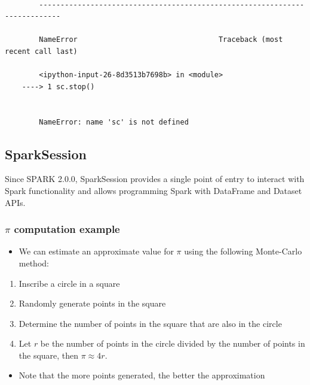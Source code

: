 \documentclass[11pt]{article}
\providecommand{\tightlist}{%
      \setlength{\itemsep}{0pt}\setlength{\parskip}{0pt}}
\begin{document}
    \begin{Verbatim}[commandchars=\\\{\}]

        ---------------------------------------------------------------------------

        NameError                                 Traceback (most recent call last)

        <ipython-input-26-8d3513b7698b> in <module>
    ----> 1 sc.stop()
    

        NameError: name 'sc' is not defined

    \end{Verbatim}

    \subsection{SparkSession}\label{sparksession}

Since SPARK 2.0.0, SparkSession provides a single point of entry to
interact with Spark functionality and allows programming Spark with
DataFrame and Dataset APIs.

\subsubsection{\texorpdfstring{\(\pi\) computation
example}{\textbackslash{}pi computation example}}\label{pi-computation-example}

\begin{itemize}
\tightlist
\item
  We can estimate an approximate value for \(\pi\) using the following
  Monte-Carlo method:
\end{itemize}

\begin{enumerate}
\def\labelenumi{\arabic{enumi}.}
\tightlist
\item
  Inscribe a circle in a square
\item
  Randomly generate points in the square
\item
  Determine the number of points in the square that are also in the
  circle
\item
  Let \(r\) be the number of points in the circle divided by the number
  of points in the square, then \(\pi \approx 4 r\).
\end{enumerate}

\begin{itemize}
\tightlist
\item
  Note that the more points generated, the better the approximation
\end{itemize}
\end{document}
